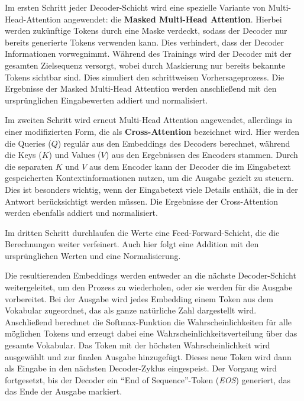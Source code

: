 Im ersten Schritt jeder Decoder-Schicht wird eine spezielle Variante von Multi-Head-Attention angewendet: die \textbf{Masked Multi-Head Attention}. 
Hierbei werden zukünftige Tokens durch eine Maske verdeckt, sodass der Decoder nur bereits generierte Tokens verwenden kann. 
Dies verhindert, dass der Decoder Informationen vorwegnimmt.  
Während des Trainings wird der Decoder mit der gesamten Zielsequenz versorgt, wobei durch Maskierung nur bereits bekannte Tokens sichtbar sind. Dies simuliert den schrittweisen Vorhersageprozess.  
Die Ergebnisse der Masked Multi-Head Attention werden anschließend mit den ursprünglichen Eingabewerten addiert und normalisiert.

Im zweiten Schritt wird erneut Multi-Head Attention angewendet, allerdings in einer modifizierten Form, die als \textbf{Cross-Attention} bezeichnet wird. 
Hier werden die Queries (\( Q \)) regulär aus den Embeddings des Decoders berechnet, während die Keys (\( K \)) und Values (\( V \)) aus den Ergebnissen des Encoders stammen. 
Durch die separaten \( K \) und \( V \) aus dem Encoder kann der Decoder die im Eingabetext gespeicherten Kontextinformationen nutzen, um die Ausgabe gezielt zu steuern. 
Dies ist besonders wichtig, wenn der Eingabetext viele Details enthält, die in der Antwort berücksichtigt werden müssen.  
Die Ergebnisse der Cross-Attention werden ebenfalls addiert und normalisiert.

Im dritten Schritt durchlaufen die Werte eine Feed-Forward-Schicht, die die Berechnungen weiter verfeinert. 
Auch hier folgt eine Addition mit den ursprünglichen Werten und eine Normalisierung.

Die resultierenden Embeddings werden entweder an die nächste Decoder-Schicht weitergeleitet, um den Prozess zu wiederholen, oder sie werden für die Ausgabe vorbereitet. 
Bei der Ausgabe wird jedes Embedding einem Token aus dem Vokabular zugeordnet, das als ganze natürliche Zahl dargestellt wird. 
Anschließend berechnet die Softmax-Funktion die Wahrscheinlichkeiten für alle möglichen Tokens und erzeugt dabei eine Wahrscheinlichkeitsverteilung über das gesamte Vokabular. 
Das Token mit der höchsten Wahrscheinlichkeit wird ausgewählt und zur finalen Ausgabe hinzugefügt. 
Dieses neue Token wird dann als Eingabe in den nächsten Decoder-Zyklus eingespeist. 
Der Vorgang wird fortgesetzt, bis der Decoder ein \enquote{End of Sequence}-Token (\textit{EOS}) generiert, das das Ende der Ausgabe markiert.
